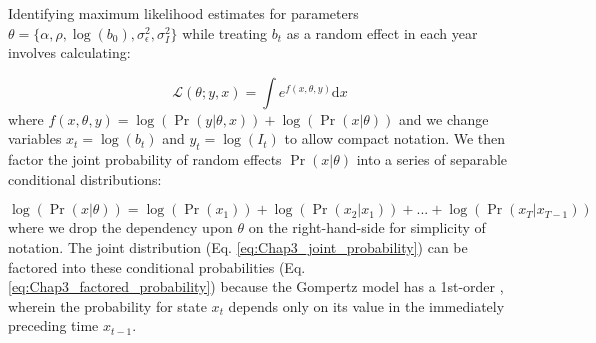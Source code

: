 Identifying maximum likelihood estimates for parameters \(\theta = \{\alpha,\rho,\log(b_0),\sigma_{\epsilon}^2,\sigma_I^2\}\) while treating \(b_t\) as a random effect in each year involves calculating:

\begin{equation} \label{eq:Chap3_joint_probability}
    \mathcal{L}( \theta; y, x ) = \int e^{f(x,\theta,y)} \mathrm{d}x 
\end{equation}
where \( f(x,\theta,y) = \log (\Pr(y | \theta, x)) + \log (\Pr( x | \theta)) \) and we change variables \( x_t = \log(b_t) \) and \( y_t = \log(I_t) \) to allow compact notation. We then factor the joint probability of random effects \( \Pr( x | \theta) \) into a series of separable conditional distributions:

\begin{equation} \label{eq:Chap3_factored_probability}
    \log(\Pr(x|\theta)) = \log (\Pr( x_1 )) + \log (\Pr( x_2 | x_1 )) + ... + \log (\Pr( x_T | x_{T-1} ))
\end{equation}
where we drop the dependency upon \(\theta\) on the right-hand-side for simplicity of notation. The joint distribution (Eq. \ref{eq:Chap3_joint_probability}) can be factored into these conditional probabilities (Eq. \ref{eq:Chap3_factored_probability}) because the Gompertz model has a 1st-order , wherein the probability for state \(x_t\) depends only on its value in the immediately preceding time \(x_{t-1}\).   

